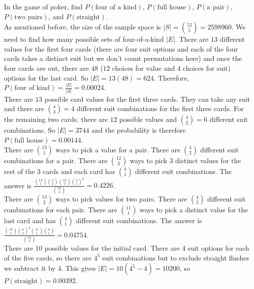 \begin{texample}
	In the game of poker, find $P(\text{four of a kind})$, $P(\text{full house})$, $P(\text{a pair})$, $P(\text{two pairs})$, and $P(\text{straight})$. \\
	
	As mentioned before, the size of the sample space is $|S|=\binom{52}{5}=2598960$. We need to find how many possible sets of four-of-a-kind $|E|$. There are $13$ different values for the first four cards (there are four suit options and each of the four cards takes a distinct suit but we don't count permutations here) and once the four cards are out, there are $48$ ($12$ choices for value and $4$ choices for suit) options for the last card. So $|E|=13(48)=624$. Therefore, $P(\text{four of kind})=\frac{|E|}{|S|}=0.00024$. \\
	
	There are $13$ possible card values for the first three cards. They can take any suit and there are $\binom{4}{3}=4$ different suit combinations for the first three cards. For the remaining two cards, there are $12$ possible values and $\binom{4}{2}=6$ different suit combinations. So $|E|=3744$ and the probability is therefore $P(\text{full house})=0.00144$. \\
	
	There are $\binom{13}{1}$ ways to pick a value for a pair. There are $\binom{4}{2}$ different suit combinations for a pair. There are $\binom{12}{3}$ ways to pick $3$ distinct values for the rest of the $3$ cards and each card has $\binom{4}{1}$ different suit combinations. The answer is $\frac{\binom{13}{1}\binom{4}{2}\binom{12}{3}\binom{4}{1}^3}{\binom{52}{5}}=0.4226$. \\
	
	There are $\binom{13}{2}$ ways to pick values for two pairs. There are $\binom{4}{2}$ different suit combinations for each pair. There are $\binom{11}{1}$ ways to pick a distinct value for the last card and has $\binom{4}{1}$ different suit combinations. The answer is $\frac{\binom{13}{2}\binom{4}{2}^2\binom{11}{1}\binom{4}{1}}{\binom{52}{5}}=0.04754$. \\
	
	There are 10 possible values for the initial card. There are 4 suit options for each of the five cards, so there are $4^5$ suit combinations but to exclude straight flushes we subtract it by 4. This gives $|E|=10(4^5-4)=10200$, so $P(\text{straight})=0.00392$.
\end{texample}

